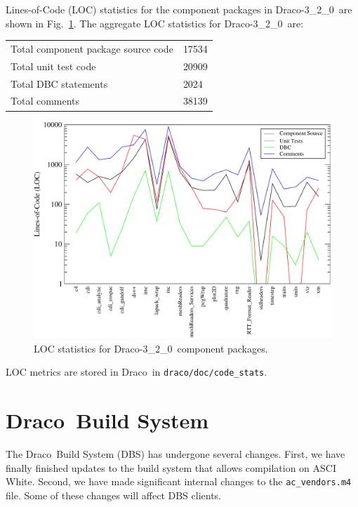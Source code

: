 \documentclass[note]{ResearchNote_pdf}
\newcommand{\draco}{Draco}
\newcommand{\dracor}{\draco-3\_2\_0}
\begin{document}
Lines-of-Code (LOC) statistics for the component packages in \dracor\ 
are shown in Fig.~\ref{fig:stats}.  The aggregate LOC statistics for
\dracor\ are:
\begin{center}
  \begin{tabular}{|l|l|} \hline
    Total component package source code & 17534 \\
    Total unit test code & 20909 \\
    Total DBC statements & 2024 \\
    Total comments & 38139 \\
    \hline
  \end{tabular}
\end{center}
\begin{figure}
  \label{fig:stats}
  \centerline{
    \includegraphics[width=6in]{loc-3_2_0}}
  \caption{LOC statistics for \dracor\ component packages.}
\end{figure}

LOC metrics are stored in \draco\ in \texttt{draco/doc/code\_stats}.


\section{\draco\ Build System}

The \draco\ Build System (DBS) has undergone several changes.  First,
we have finally finished updates to the build system that allows
compilation on ASCI White.  Second, we have made significant internal
changes to the \texttt{ac\_vendors.m4} file.  Some of these changes
will affect DBS clients. 
\end{document}
